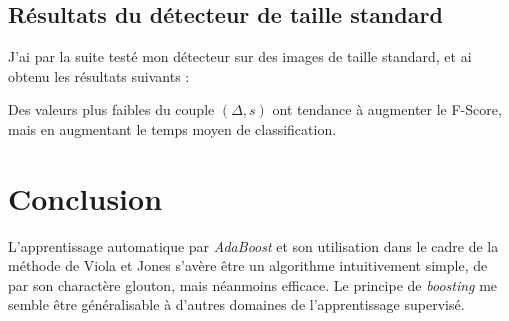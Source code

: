 \documentclass[12pt,a4paper]{article}
\begin{document}
\subsection{Résultats du détecteur de taille standard}
\label{sec:results-standard}
J'ai par la suite testé mon détecteur sur des images de taille standard, et ai obtenu les résultats suivants :
\renewcommand{\arraystretch}{1.3}
\begin{table}[h]
    
\end{table}

Des valeurs plus faibles du couple $(\Delta, s)$ ont tendance à augmenter le F-Score, mais en augmentant le temps moyen de classification.

\section{Conclusion}
L'apprentissage automatique par \textit{AdaBoost} et son utilisation dans le cadre de la méthode de Viola et Jones s'avère être un algorithme intuitivement simple, de par son charactère glouton, mais néanmoins efficace. Le principe de \textit{boosting} me semble être généralisable à d'autres domaines de l'apprentissage supervisé.

\newpage
\end{document}
